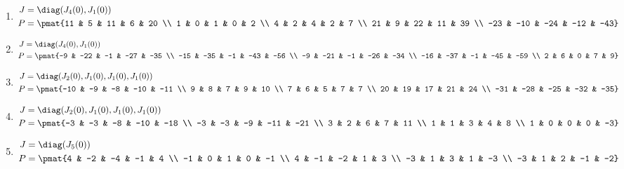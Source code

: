 \begin{enumerate}
\item

\begin{align*}
J &= \diag(J_{4}(0), J_{1}(0))\\
P &= \pmat{11 & 5 & 11 & 6 & 20 \\ 1 & 0 & 1 & 0 & 2 \\ 4 & 2 & 4 & 2 & 7 \\ 21 & 9 & 22 & 11 & 39 \\ -23 & -10 & -24 & -12 & -43}
\end{align*}

\item

\begin{align*}
J &= \diag(J_{4}(0), J_{1}(0))\\
P &= \pmat{-9 & -22 & -1 & -27 & -35 \\ -15 & -35 & -1 & -43 & -56 \\ -9 & -21 & -1 & -26 & -34 \\ -16 & -37 & -1 & -45 & -59 \\ 2 & 6 & 0 & 7 & 9}
\end{align*}

\item

\begin{align*}
J &= \diag(J_{2}(0), J_{1}(0), J_{1}(0), J_{1}(0))\\
P &= \pmat{-10 & -9 & -8 & -10 & -11 \\ 9 & 8 & 7 & 9 & 10 \\ 7 & 6 & 5 & 7 & 7 \\ 20 & 19 & 17 & 21 & 24 \\ -31 & -28 & -25 & -32 & -35}
\end{align*}

\item

\begin{align*}
J &= \diag(J_{2}(0), J_{1}(0), J_{1}(0), J_{1}(0))\\
P &= \pmat{-3 & -3 & -8 & -10 & -18 \\ -3 & -3 & -9 & -11 & -21 \\ 3 & 2 & 6 & 7 & 11 \\ 1 & 1 & 3 & 4 & 8 \\ 1 & 0 & 0 & 0 & -3}
\end{align*}

\item

\begin{align*}
J &= \diag(J_{5}(0))\\
P &= \pmat{4 & -2 & -4 & -1 & 4 \\ -1 & 0 & 1 & 0 & -1 \\ 4 & -1 & -2 & 1 & 3 \\ -3 & 1 & 3 & 1 & -3 \\ -3 & 1 & 2 & -1 & -2}
\end{align*}


\end{enumerate}
